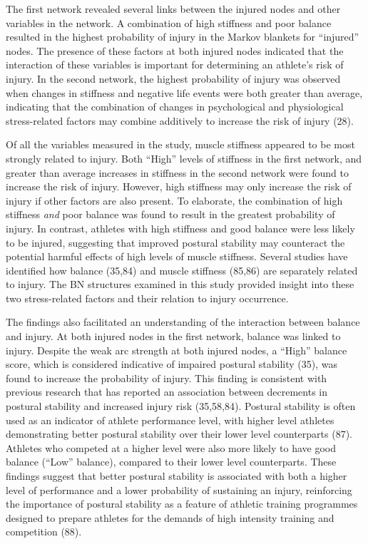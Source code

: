 \documentclass[
  english,
  man]{apa6}
\begin{document}
The first network revealed several links between the injured nodes and other variables in the network. A combination of high stiffness and poor balance resulted in the highest probability of injury in the Markov blankets for ``injured'' nodes. The presence of these factors at both injured nodes indicated that the interaction of these variables is important for determining an athlete's risk of injury. In the second network, the highest probability of injury was observed when changes in stiffness and negative life events were both greater than average, indicating that the combination of changes in psychological and physiological stress-related factors may combine additively to increase the risk of injury (28).

Of all the variables measured in the study, muscle stiffness appeared to be most strongly related to injury.
Both ``High'' levels of stiffness in the first network, and greater than average increases in stiffness in the second network were found to increase the risk of injury.
However, high stiffness may only increase the risk of injury if other factors are also present.
To elaborate, the combination of high stiffness \emph{and} poor balance was found to result in the greatest probability of injury.
In contrast, athletes with high stiffness and good balance were less likely to be injured, suggesting that improved postural stability may counteract the potential harmful effects of high levels of muscle stiffness.
Several studies have identified how balance (35,84) and muscle stiffness (85,86) are separately related to injury. The BN structures examined in this study provided insight into these two stress-related factors and their relation to injury occurrence.

The findings also facilitated an understanding of the interaction between balance and injury. At both injured nodes in the first network, balance was linked to injury. Despite the weak arc strength at both injured nodes, a ``High'' balance score, which is considered indicative of impaired postural stability (35), was found to increase the probability of injury. This finding is consistent with previous research that has reported an association between decrements in postural stability and increased injury risk (35,58,84).
Postural stability is often used as an indicator of athlete performance level, with higher level athletes demonstrating better postural stability over their lower level counterparts (87).
Athletes who competed at a higher level were also more likely to have good balance (``Low'' balance), compared to their lower level counterparts.
These findings suggest that better postural stability is associated with both a higher level of performance and a lower probability of sustaining an injury, reinforcing the importance of postural stability as a feature of athletic training programmes designed to prepare athletes for the demands of high intensity training and competition (88).
\end{document}
